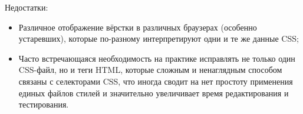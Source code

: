 Недостатки:
\begin{itemize}
	\item Различное отображение вёрстки в различных браузерах (особенно устаревших), которые по-разному интерпретируют одни и те же данные CSS;
	\item Часто встречающаяся необходимость на практике исправлять не только один CSS-файл, но и теги HTML, которые сложным и ненаглядным способом связаны с селекторами CSS, что иногда сводит на нет простоту применения единых файлов стилей и значительно увеличивает время редактирования и тестирования.
\end{itemize}